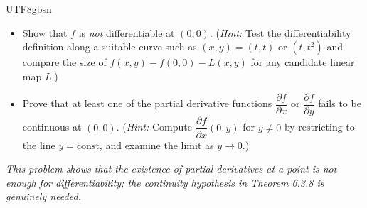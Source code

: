 \documentclass[addpoints]{exam}
\theoremstyle{definition}
\begin{document}
\begin{CJK*}{UTF8}{gbsn}
\begin{questions}
\begin{itemize}
\item[(b)] Show that $f$ is \emph{not} differentiable at $(0,0)$.
(\emph{Hint:} Test the differentiability definition along a suitable curve such as $(x,y)=(t,t)$ or $(t,t^2)$ and compare the size of
$f(x,y)-f(0,0)-L(x,y)$ for any candidate linear map $L$.)

\item[(c)] Prove that at least one of the partial derivative functions
$\dfrac{\partial f}{\partial x}$ or $\dfrac{\partial f}{\partial y}$
fails to be continuous at $(0,0)$.
(\emph{Hint:} Compute $\dfrac{\partial f}{\partial x}(0,y)$ for $y\neq 0$ by restricting to the line $y=\text{const}$, and examine the limit as $y\to 0$.)
\end{itemize}

\medskip
\noindent\emph{This problem shows that the existence of partial derivatives at a point is not enough for differentiability; the continuity hypothesis in Theorem 6.3.8 is genuinely needed.}


\begin{solution}

\end{solution}

\end{questions}

\end{CJK*}
\end{document}
